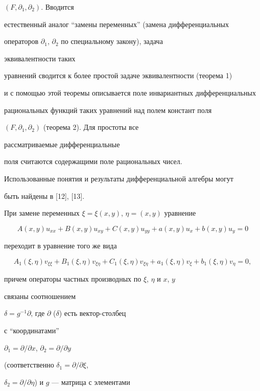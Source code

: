 $(F,\partial_1,\partial_2)$. Вводится  


естественный аналог ``замены переменных'' (замена дифференциальных  


операторов $\partial_1$, $\partial_2$ по специальному закону), задача 


эквивалентности таких  


уравнений сводится к более простой задаче эквивалентности (теорема 1)  


и с помощью этой теоремы описывается поле инвариантных дифференциальных 


рациональных функций таких уравнений над полем констант поля  


$(F,\partial_1,\partial_2)$ (теорема 2). Для простоты все 


рассматриваемые дифференциальные 


поля считаются содержащими поле рациональных чисел.  


 


Использованные понятия и результаты дифференциальной алгебры могут 


быть найдены в [12], [13].  


 


При замене переменных $\xi=\xi(x,y)$, $\eta=(x,y)$ уравнение 


$$ 


A(x,y)u_{xx}+B(x,y)u_{xy}+C(x,y)u_{yy}+a(x,y)u_x+b(x,y)u_y=0 


$$ 


переходит в уравнение того же вида 


$$ 


A_1(\xi,\eta)v_{\xi\xi}+B_1(\xi,\eta)v_{\xi\eta}+ 


C_1(\xi,\eta)v_{\xi\eta}+a_1(\xi,\eta)v_\xi+b_1(\xi,\eta)v_\eta=0, 


$$ 


причем операторы частных производных по $\xi$, $\eta$ и $x$, $y$ 


связаны соотношением 


$\delta=g^{-1}\partial$, где $\partial$ ($\delta$) есть вектор-столбец 


с ``координатами'' 


$\partial_1=\partial/\partial x$, $\partial_2=\partial/\partial y$ 


(соответственно $\delta_1=\partial/\partial\xi$, 


$\delta_2=\partial/\partial\eta$) и $g$ --- матрица с элементами 


